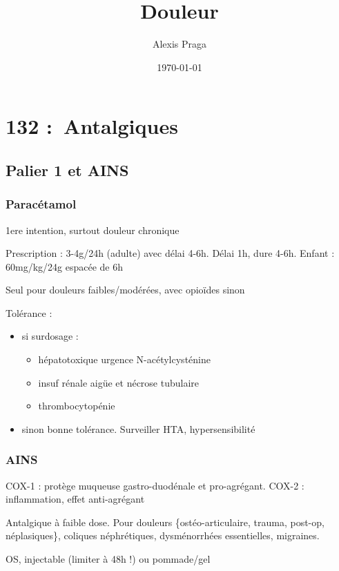 \documentclass[11pt]{article}
\author{Alexis Praga}
\date{\today}
\title{Douleur}
\begin{document}
\maketitle
\tableofcontents



\section{132 : Antalgiques}
\label{sec:org7bdcd6d}
\subsection{Palier 1 et AINS}
\label{sec:org6316170}
\subsubsection{Paracétamol}
\label{sec:orga77273a}
1ere intention, surtout douleur chronique

Prescription : 3-4g/24h (adulte) avec délai 4-6h. Délai 1h, dure 4-6h. Enfant : 60mg/kg/24g
espacée de 6h 

Seul pour douleurs faibles/modérées, avec opioïdes sinon

Tolérance :
\begin{itemize}
\item si surdosage : 
\begin{itemize}
\item hépatotoxique \thus urgence \skull \thus N-acétylcysténine
\item insuf rénale aigüe et nécrose tubulaire
\item thrombocytopénie
\end{itemize}
\item sinon bonne tolérance. Surveiller HTA, hypersensibilité
\end{itemize}

\subsubsection{AINS}
\label{sec:org87bbc0f}
COX-1 : protège muqueuse gastro-duodénale et pro-agrégant. COX-2 : inflammation,
effet anti-agrégant

Antalgique à faible dose. Pour douleurs \{ostéo-articulaire, trauma, post-op,
néplasiques\}, coliques néphrétiques, dysménorrhées essentielles, migraines.

OS, injectable (limiter à 48h !) ou pommade/gel
\end{document}

